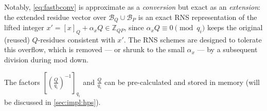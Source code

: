 Notably, \eqref{eq:fastbconv} is approximate as a \textit{conversion} but exact as an \textit{extension}: the extended residue vector over $\mathcal{B}_Q\cup\mathcal{B}_P$ is an exact RNS representation of the lifted integer $x' = [x]_Q + \alpha_x Q \in \mathbb{Z}_{QP}$, since $\alpha_x Q \equiv 0 \pmod{q_i}$ keeps the original (reused) $Q$-residues consistent with $x'$. The RNS schemes are designed to tolerate this overflow, which is removed --- or shrunk to the small $\alpha_x$ --- by a subsequent division during mod down.


\begin{remark}
    The factors $[(\frac{Q}{q_i})^{-1}]_{q_i}$ and $\frac{Q}{q_i}$ can be pre-calculated and stored in memory (will be discussed in \autoref{sec:impl:hps}).
\end{remark}




